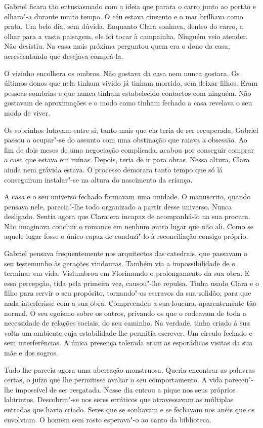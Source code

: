 Gabriel ficara tão entusiasmado com a ideia que parara o carro junto ao
portão e olhara"-a durante muito tempo. O céu estava cinzento e o mar
brilhava como prata. Um belo dia, sem dúvida. Enquanto Clara sonhava,
dentro do carro, a olhar para a vasta paisagem, ele foi tocar à
campainha. Ninguém veio atender. Não desistiu. Na casa mais próxima
perguntou quem era o dono da casa, acrescentando que desejava comprá-la.

O vizinho encolhera os ombros. Não gostava da casa nem nunca gostara. Os
últimos donos que nela tinham vivido já tinham morrido, sem deixar
filhos. Eram pessoas sombrias e que nunca tinham estabelecido contactos
com ninguém. Não gostavam de aproximações e o modo como tinham fechado a
casa revelava o seu modo de viver.

Os sobrinhos lutavam entre si, tanto mais que ela teria de ser
recuperada. Gabriel passou a ocupar"-se do assunto com uma obstinação que
raiava a obsessão. Ao fim de dois meses de uma negociação complicada,
acabou por conseguir comprar a casa que estava em ruínas. Depois, teria
de ir para obras. Nessa altura, Clara ainda nem grávida estava. O
processo demorara tanto tempo que só lá conseguiram instalar"-se na
altura do nascimento da criança.

A casa e o seu universo fechado formavam uma unidade. O manuscrito,
quando pensava nele, parecia"-lhe todo organizado a partir desse
universo. Nunca desligado. Sentia agora que Clara era incapaz de
acompanhá-lo na sua procura. Não imaginava concluir o romance em nenhum
outro lugar que não ali. Como se aquele lugar fosse o único capaz de
conduzi"-lo à reconciliação consigo próprio.

Gabriel pensava frequentemente nos arquitectos das catedrais, que
passavam o seu testemunho às gerações vindouras. Também via a
impossibilidade de o terminar em vida. Vislumbrou em Florimundo o
prolongamento da sua obra. E essa percepção, tida pela primeira vez,
causou"-lhe repulsa. Tinha usado Clara e o filho para servir o seu
propósito, tornando"-os escravos da sua solidão, para que nada
interferisse com a sua obra. Compreendeu a sua loucura, aparentemente
tão normal. O seu egoísmo sobre os outros, privando os que o rodeavam de
toda a necessidade de relações sociais, do seu caminho. Na verdade,
tinha criado à sua volta um ambiente cuja estabilidade lhe permitia
escrever. Um círculo fechado e sem interferências. A única presença
tolerada eram as esporádicas visitas da sua mãe e dos sogros.

Tudo lhe parecia agora uma aberração monstruosa. Queria encontrar as
palavras certas, o juízo que lhe permitisse avaliar o seu comportamento.
A vida pareceu"-lhe impossível de ser resgatada. Nesse dia entrou a pique
nos seus próprios labirintos. Descobriu"-se nos seres erráticos que
atravessavam as múltiplas entradas que havia criado. Seres que se
sonhavam e se fechavam nos anéis que os envolviam. O homem sem rosto
esperava"-o ao canto da biblioteca.

